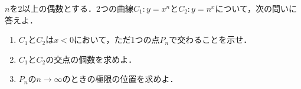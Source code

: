 \documentclass[../../main.tex]{subfiles}
\begin{document}
$n$を2以上の偶数とする．2つの曲線$C_1: y=x^n$と$C_2: y=n^x$について，次の問いに答えよ．

\begin{enumerate}
  \item $C_1$と$C_2$は$x<0$において，ただ1つの点$P_n$で交わることを示せ．
  \item $C_1$と$C_2$の交点の個数を求めよ．
  \item $P_n$の$n \to \infty$のときの極限の位置を求めよ．
\end{enumerate}
\end{document}
